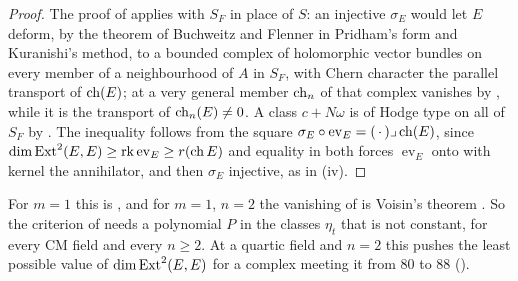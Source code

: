 \begin{proof}
The proof of  applies with $S_{F}$ in place of $S$: an
injective $\sigma_{E}$ would let $E$ deform, by the theorem of Buchweitz and
Flenner in Pridham's form and Kuranishi's method, to a bounded complex of
holomorphic vector bundles on every member of a neighbourhood of $A$ in
$S_{F}$, with Chern character the parallel transport of $\operatorname{ch}(E)$; at a very
general member $\operatorname{ch}_{n}$ of that complex vanishes by
, while it is the transport of
$\operatorname{ch}_{n}(E)\ne0$. A class $c+N\omega$ is of Hodge type on all of $S_{F}$ by
. The inequality follows from the square
$\sigma_{E}\circ\operatorname{ev}_{E}=(\,\cdot\,)\lrcorner\operatorname{ch}(E)$, since
$\dim\operatorname{Ext}^{2}(E,E)\ge\operatorname{rk}\operatorname{ev}_{E}\ge r(\operatorname{ch} E)$ and
equality in both forces $\operatorname{ev}_{E}$ onto with kernel the
annihilator, and then $\sigma_{E}$ injective, as in
(iv).
\end{proof}

For $m=1$ this is , and for $m=1$, $n=2$ the vanishing of
 is Voisin's theorem \cite[Theorem~10]{Voi02b}.
So the criterion of \cite[Theorem~17.7(v)]{paperI} needs a polynomial $P$ in the
classes $\eta_{t}$ that is not constant, for every CM field and every
$n\ge2$. At a quartic field and $n=2$ this pushes the least possible value of
$\dim\operatorname{Ext}^{2}(E,E)$ for a complex meeting it from $80$ to $88$
().
